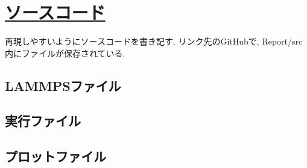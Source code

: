 \chapter{\href{https://github.com/m-agnet/Report.git}{ソースコード}}

再現しやすいようにソースコードを書き記す. リンク先のGitHubで, Report/src内にファイルが保存されている.

\section{LAMMPSファイル}


\section{実行ファイル}



\section{プロットファイル}

